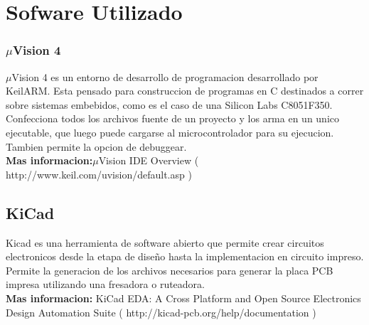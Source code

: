 \section{Sofware Utilizado} %
\label{sec:sofware_utilizado}


\subsubsection{$\mu$Vision 4} %
\label{ssub:uvision_4}

$\mu$Vision 4 es un entorno de desarrollo de programacion desarrollado por KeilARM. Esta pensado para construccion de programas en C destinados a correr sobre sistemas embebidos, como es el caso de una Silicon Labs C8051F350. Confecciona todos los archivos fuente de un proyecto y los arma en un unico ejecutable, que luego puede cargarse al microcontrolador para su ejecucion. Tambien permite la opcion de debuggear. \\

\textbf{Mas informacion:}$\mu$Vision IDE Overview ( http://www.keil.com/uvision/default.asp )



\subsection{KiCad} %
\label{sub:kicad}

Kicad es una herramienta de software abierto que permite crear circuitos electronicos desde la etapa de dise\~no hasta la implementacion en circuito impreso. Permite la generacion de los archivos necesarios para generar la placa PCB impresa utilizando una fresadora o ruteadora.  \\


\textbf{Mas informacion:} KiCad EDA: A Cross Platform and Open Source Electronics Design Automation Suite ( http://kicad-pcb.org/help/documentation )






